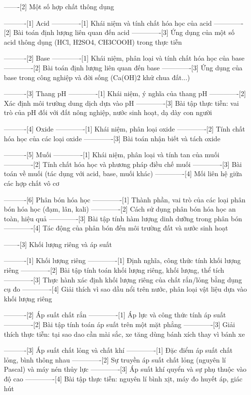 -------[2] Một số hợp chất thông dụng

----------[1] Acid
-------------[1] Khái niệm và tính chất hóa học của acid
-------------[2] Bài toán định lượng liên quan đến acid
-------------[3] Ứng dụng của một số acid thông dụng (HCl, H2SO4, CH3COOH) trong thực tiễn

----------[2] Base
-------------[1] Khái niệm, phân loại và tính chất hóa học của base
-------------[2] Bài toán định lượng liên quan đến base
-------------[3] Ứng dụng của base trong công nghiệp và đời sống (Ca(OH)2 khử chua đất...)

----------[3] Thang pH
-------------[1] Khái niệm, ý nghĩa của thang pH
-------------[2] Xác định môi trường dung dịch dựa vào pH
-------------[3] Bài tập thực tiễn: vai trò của pH đối với đất nông nghiệp, nước sinh hoạt, dạ dày con người

----------[4] Oxide
-------------[1] Khái niệm, phân loại oxide
-------------[2] Tính chất hóa học của các loại oxide
-------------[3] Bài toán nhận biết và tách oxide

----------[5] Muối
-------------[1] Khái niệm, phân loại và tính tan của muối
-------------[2] Tính chất hóa học và phương pháp điều chế muối
-------------[3] Bài toán về muối (tác dụng với acid, base, muối khác)
-------------[4] Mối liên hệ giữa các hợp chất vô cơ

----------[6] Phân bón hóa học
-------------[1] Thành phần, vai trò của các loại phân bón hóa học (đạm, lân, kali)
-------------[2] Cách sử dụng phân bón hóa học an toàn, hiệu quả
-------------[3] Bài tập tính hàm lượng dinh dưỡng trong phân bón
-------------[4] Tác động của phân bón đến môi trường đất và nước sinh hoạt

-------[3] Khối lượng riêng và áp suất

----------[1] Khối lượng riêng
-------------[1] Định nghĩa, công thức tính khối lượng riêng
-------------[2] Bài tập tính toán khối lượng riêng, khối lượng, thể tích
-------------[3] Thực hành xác định khối lượng riêng của chất rắn/lỏng bằng dụng cụ đo
-------------[4] Giải thích vì sao dầu nổi trên nước, phân loại vật liệu dựa vào khối lượng riêng

----------[2] Áp suất chất rắn
-------------[1] Áp lực và công thức tính áp suất
-------------[2] Bài tập tính toán áp suất trên một mặt phẳng
-------------[3] Giải thích thực tiễn: tại sao dao cần mài sắc, xe tăng dùng bánh xích thay vì bánh xe

----------[3] Áp suất chất lỏng và chất khí
-------------[1] Đặc điểm áp suất chất lỏng, bình thông nhau
-------------[2] Sự truyền áp suất chất lỏng (nguyên lí Pascal) và máy nén thủy lực
-------------[3] Áp suất khí quyển và sự phụ thuộc vào độ cao
-------------[4] Bài tập thực tiễn: nguyên lí bình xịt, máy đo huyết áp, giác hút

